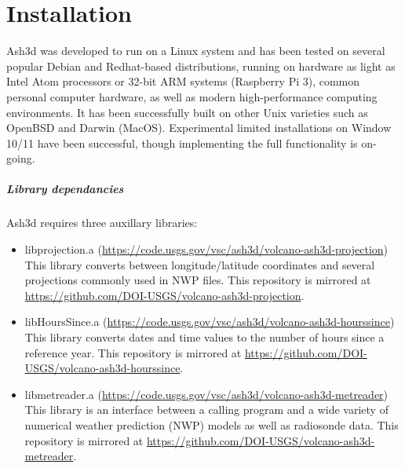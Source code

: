 \chapter{Installation}\label{ChapInstall}
Ash3d was developed to run on a Linux system and has been tested on several
popular Debian and Redhat-based distributions, running on hardware as light
as Intel Atom processors or 32-bit ARM systems (Raspberry Pi 3), common
personal computer hardware, as well as modern high-performance computing
environments.
It has been successfully built on other Unix varieties such as OpenBSD
and Darwin (MacOS).  Experimental limited installations on Window 10/11 have been
successful, though implementing the full functionality is on-going.

\paragraph{Library dependancies}
Ash3d requires three auxillary libraries:
\begin{itemize}
\item libprojection.a (\url{https://code.usgs.gov/vsc/ash3d/volcano-ash3d-projection}) \\
This library converts between longitude/latitude coordinates and several projections
commonly used in NWP files.
This repository is mirrored at \url{https://github.com/DOI-USGS/volcano-ash3d-projection}.

\item libHoursSince.a (\url{https://code.usgs.gov/vsc/ash3d/volcano-ash3d-hourssince}) \\
This library converts dates and time values to the number of hours since a
reference year.
This repository is mirrored at \url{https://github.com/DOI-USGS/volcano-ash3d-hourssince}.

\item libmetreader.a  (\url{https://code.usgs.gov/vsc/ash3d/volcano-ash3d-metreader}) \\
This library is an interface between a calling program and a wide variety of
numerical weather prediction (NWP) models as well as radiosonde data.
This repository is mirrored at \url{https://github.com/DOI-USGS/volcano-ash3d-metreader}.

\end{itemize}

